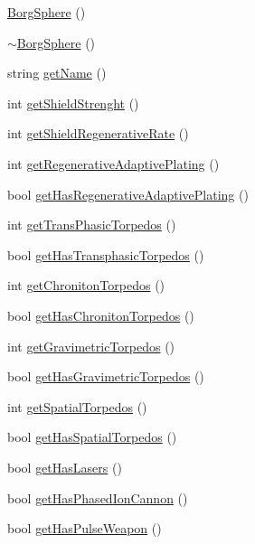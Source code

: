 \begin{DoxyCompactItemize}
\item 
\hyperlink{classBorgSphere_a78ccec8f5d5f1da244b25bec7daebf3a}{BorgSphere} ()
\item 
\hyperlink{classBorgSphere_aa858deaede825f3c2baeddb1cd9fe6a4}{$\sim$BorgSphere} ()
\item 
string \hyperlink{classBorgSphere_a8ff1212f630e7aeb10a6c5249ddd2855}{getName} ()
\item 
int \hyperlink{classBorgSphere_ac67f18e6aa38cf24087411603c3b981f}{getShieldStrenght} ()
\item 
int \hyperlink{classBorgSphere_ac8e9c5b8d9cc105baaa8590171758f9c}{getShieldRegenerativeRate} ()
\item 
int \hyperlink{classBorgSphere_af697ff58376c915ff2bdebad34762296}{getRegenerativeAdaptivePlating} ()
\item 
bool \hyperlink{classBorgSphere_aaf7c47b6913205611bd393345e6264fc}{getHasRegenerativeAdaptivePlating} ()
\item 
int \hyperlink{classBorgSphere_a39fcff670b0233e6ee9eb8b25b723e36}{getTransPhasicTorpedos} ()
\item 
bool \hyperlink{classBorgSphere_a30ef04ddddf5cea157cd73decad5f1c3}{getHasTransphasicTorpedos} ()
\item 
int \hyperlink{classBorgSphere_a2db684357bc18ffcefcb122e70b1034e}{getChronitonTorpedos} ()
\item 
bool \hyperlink{classBorgSphere_a810ef64404ee9a78f8842ef49d998019}{getHasChronitonTorpedos} ()
\item 
int \hyperlink{classBorgSphere_ab6be228e635612baa31385b5f9b7b4f6}{getGravimetricTorpedos} ()
\item 
bool \hyperlink{classBorgSphere_a5c829167ede9b93d7712feed42ebc25c}{getHasGravimetricTorpedos} ()
\item 
int \hyperlink{classBorgSphere_a7cdfa2bc35a23ff6030b2f0071aa0fef}{getSpatialTorpedos} ()
\item 
bool \hyperlink{classBorgSphere_a164d0b9916b378571c2ecf4e2cca604a}{getHasSpatialTorpedos} ()
\item 
bool \hyperlink{classBorgSphere_a1330e8f6c05c6eaf44b601be57d6689a}{getHasLasers} ()
\item 
bool \hyperlink{classBorgSphere_a4fa0c397f2591be8dd30a26fdbf1aa8c}{getHasPhasedIonCannon} ()
\item 
bool \hyperlink{classBorgSphere_a664d07854cf4ccbc82794634946af59f}{getHasPulseWeapon} ()
\item 

\end{DoxyCompactItemize}
